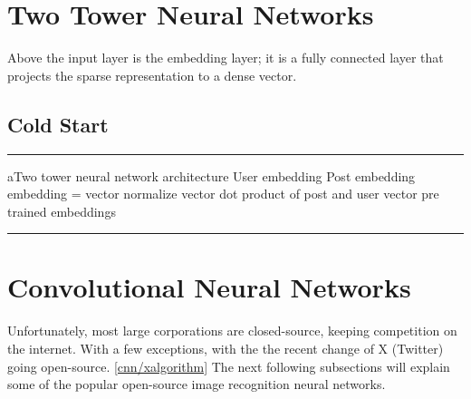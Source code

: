 \section{Two Tower Neural Networks} \label{nn}

Above the input layer is the embedding layer; it is a fully
connected layer that projects the sparse representation to
a dense vector.  \cite{10.1145/3038912.3052569}

\subsection{Cold Start}\label{cold-start}

\noindent\rule{2cm}{0.4pt}

aTwo tower neural network architecture 
User embedding
Post embedding
embedding = vector
normalize vector
dot product of post and user vector
pre trained embeddings

\noindent\rule{2cm}{0.4pt}

\section{Convolutional Neural Networks}

Unfortunately, most large corporations are closed-source, keeping competition on the internet. With a few exceptions, with the the recent change of X (Twitter) going open-source. \ref{cnn/xalgorithm} The next following subsections will explain some of the popular open-source image recognition neural networks.







